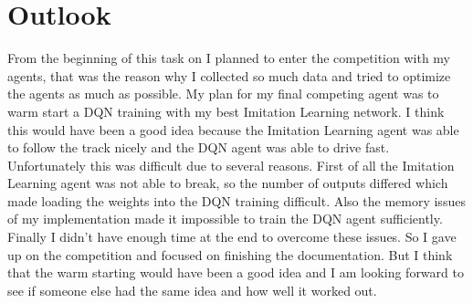 \documentclass[10pt]{scrartcl}
\begin{document}
\section{Outlook}
From the beginning of this task on I planned to enter the competition with my agents, that was the reason why I collected so much data and tried to optimize the agents as much as possible. My plan for my final competing agent was to warm start a DQN training with my best Imitation Learning network. I think this would have been a good idea because the Imitation Learning agent was able to follow the track nicely and the DQN agent was able to drive fast. Unfortunately this was difficult due to several reasons. First of all the Imitation Learning agent was not able to break, so the number of outputs differed which made loading the weights into the DQN training difficult. Also the memory issues of my implementation made it impossible to train the DQN agent sufficiently. Finally I didn't have enough time at the end to overcome these issues. So I gave up on the competition and focused on finishing the documentation. But I think that the warm starting would have been a good idea and I am looking forward to see if someone else had the same idea and how well it worked out.

\newpage
\end{document}

